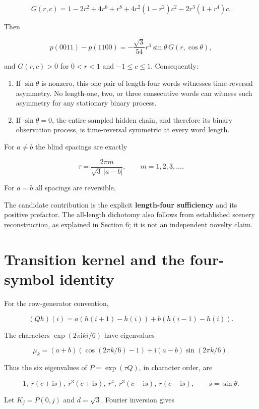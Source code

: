 \documentclass[11pt,a4paper]{article}
\providecommand{\tightlist}{\setlength{\itemsep}{0pt}\setlength{\parskip}{0pt}}
\begin{document}
\[G(r,c)=1-2r^2+4r^6+r^8+4r^2(1-r^2)c^2-2r^3(1+r^4)c.\]

Then

\[p(0011)-p(1100)=-\frac{\sqrt3}{54}r^3\sin\theta\,G(r,\cos\theta),\]

and \(G(r,c)>0\) for \(0<r<1\) and \(-1\le c\le1\). Consequently:

\begin{enumerate}
\def\labelenumi{\arabic{enumi}.}
\tightlist
\item
  If \(\sin\theta\) is nonzero, this one pair of length-four words
  witnesses time-reversal asymmetry. No length-one, two, or three
  consecutive words can witness such asymmetry for any stationary binary
  process.
\item
  If \(\sin\theta=0\), the entire sampled hidden chain, and therefore
  its binary observation process, is time-reversal symmetric at every
  word length.
\end{enumerate}

For \(a\ne b\) the blind spacings are exactly

\[\tau=\frac{2\pi m}{\sqrt3\,|a-b|},\qquad m=1,2,3,\ldots.\]

For \(a=b\) all spacings are reversible.

The candidate contribution is the explicit \textbf{length-four
sufficiency} and its positive prefactor. The all-length dichotomy also
follows from established scenery reconstruction, as explained in Section
6; it is not an independent novelty claim.

\hypertarget{transition-kernel-and-the-four-symbol-identity}{%
\section{Transition kernel and the four-symbol
identity}\label{transition-kernel-and-the-four-symbol-identity}}

For the row-generator convention,

\[ (Qh)(i)=a(h(i+1)-h(i))+b(h(i-1)-h(i)).\]

The characters \(\exp(2\pi\mathrm{i}ki/6)\) have eigenvalues

\[\mu_k=(a+b)(\cos(2\pi k/6)-1)+\mathrm{i}(a-b)\sin(2\pi k/6).\]

Thus the six eigenvalues of \(P=\exp(\tau Q)\), in character order, are

\[1,\ r(c+\mathrm{i}s),\ r^3(c+\mathrm{i}s),\ r^4,
\ r^3(c-\mathrm{i}s),\ r(c-\mathrm{i}s),\qquad s=\sin\theta.\]

Let \(K_j=P(0,j)\) and \(d=\sqrt{3}\). Fourier inversion gives
\end{document}

